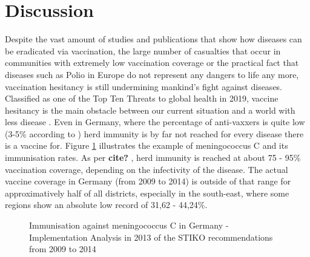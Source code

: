 \documentclass[12pt,a4paper,twoside]{article}
\begin{document}
\section{Discussion}

Despite the vast amount of studies and publications that show how diseases can be eradicated via vaccination, the large number of casualties that occur in communities with extremely low vaccination coverage or the practical fact that diseases such as Polio in Europe do not represent any dangers to life any more, vaccination hesitancy is still undermining mankind's fight against diseases. Classified as one of the Top Ten Threats to global health in 2019, vaccine hesitancy is the main obstacle between our current situation and a world with less disease \cite{WHOAkbar2019}. Even in Germany, where the percentage of anti-vaxxers is quite low (3-5\% according to \cite{Meyer2004}) herd immunity is by far not reached for every disease there is a vaccine for. Figure \ref{fig:impfkarte_meningokokken} illustrates the example of meningococcus C and its immunisation rates. As per \textbf{cite?}%
, herd immunity is reached at about 75 - 95\% vaccination coverage, depending on the infectivity of the disease. The actual vaccine coverage in Germany (from 2009 to 2014) is outside of that range for approximatively half of all districts, especially in the south-east, where some regions show an absolute low record of 31,62 - 44,24\%.

\begin{figure}[h!]
	\centering
	\caption{Immunisation against meningococcus C in Germany - Implementation Analysis in 2013 of the \ac{STIKO} recommendations from 2009 to 2014 \cite{LamegoGreinerMGoffrierB2016}}
	\label{fig:impfkarte_meningokokken}
	\def\svgwidth{350pt}
	
\end{figure}
\end{document}
